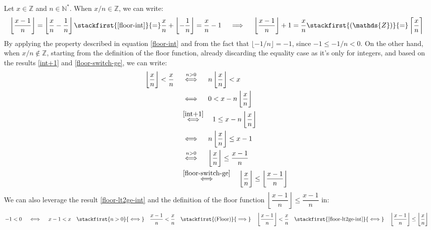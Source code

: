 Let $x \in \mathds{Z}$ and $n \in \mathds{N}^*$.
When $x/n \in \mathds{Z}$, we can write:
\[
    \left\lfloor \dfrac{x - 1}{n} \right\rfloor =
    \left\lfloor \dfrac{x}{n} - \dfrac{1}{n} \right\rfloor
      \stackfirst{\text{\eqref{floor-int}}}{=}
    \dfrac{x}{n} + \left\lfloor - \dfrac{1}{n} \right\rfloor =
    \dfrac{x}{n} - 1
  \quad\implies\quad
    \left\lfloor \dfrac{x - 1}{n} \right\rfloor + 1 =
    \dfrac{x}{n}
      \stackfirst{(\mathds{Z})}{=}
    \left\lceil \dfrac{x\vphantom{l}}{n} \right\rceil
\]
By applying the property described in equation \eqref{floor-int}
and from the fact that $\lfloor -1/n \rfloor = -1$,
since $-1 \le -1/n < 0$.
On the other hand, when $x/n \notin \mathds{Z}$,
starting from the definition of the floor function,
already discarding the equality case as it's only for integers,
and based on the results \eqref{int+1} and \eqref{floor-switch-ge},
we can write:
\begin{align*}
    \left\lfloor \dfrac{x\vphantom{l}}{n} \right\rfloor
    < \dfrac{x\vphantom{l}}{n}
  &\quad\stackrel{\rule[-.3em]{0pt}{0pt}n > 0}{\iff}\quad
    n \left\lfloor \dfrac{x\vphantom{l}}{n} \right\rfloor < x
  \\&\quad\iff\quad
    0 < x - n \left\lfloor \dfrac{x\vphantom{l}}{n} \right\rfloor
  \\&\quad\stackrel{\rule[-.3em]{0pt}{0pt}\eqref{int+1}}{\iff}\quad
    1 \le x - n \left\lfloor \dfrac{x\vphantom{l}}{n} \right\rfloor
  \\&\quad\iff\quad
    n \left\lfloor \dfrac{x\vphantom{l}}{n} \right\rfloor \le x - 1
  \\&\quad\stackrel{\rule[-.3em]{0pt}{0pt}n > 0}{\iff}\quad
    \left\lfloor \dfrac{x\vphantom{l}}{n} \right\rfloor
    \le \dfrac{x - 1}{n}
  \\&\quad\stackrel{\rule[-.3em]{0pt}{0pt}\eqref{floor-switch-ge}}{\iff}\quad
    \left\lfloor \dfrac{x\vphantom{l}}{n} \right\rfloor
    \le \left\lfloor \dfrac{x - 1}{n} \right\rfloor
\end{align*}
We can also leverage the result \eqref{floor-lt2ge-int}
and the definition of the floor function
$\left\lfloor \dfrac{x - 1}{n} \right\rfloor \le \dfrac{x - 1}{n}$ in:
\[
    -1 < 0
  \quad\iff\quad
    x - 1 < x
  \quad\stackfirst{n > 0}{\iff}\quad
    \dfrac{x - 1}{n} < \dfrac{x}{n}
  \quad\stackfirst{\text{(Floor)}}{\implies}\quad
    \left\lfloor \dfrac{x - 1}{n} \right\rfloor < \dfrac{x}{n}
  \quad\stackfirst{\eqref{floor-lt2ge-int}}{\iff}\quad
    \left\lfloor \dfrac{x - 1}{n} \right\rfloor
    \le \left\lfloor \dfrac{x\vphantom{l}}{n} \right\rfloor
\]

